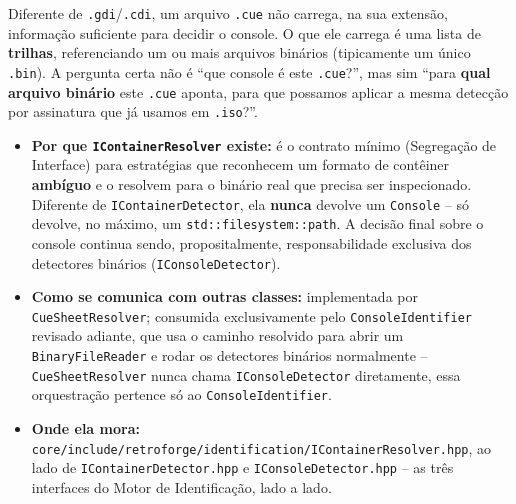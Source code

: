 Diferente de \texttt{.gdi}/\texttt{.cdi}, um arquivo \texttt{.cue} não carrega, na sua extensão, informação suficiente para decidir o console. O que ele carrega é uma lista de \textbf{trilhas}, referenciando um ou mais arquivos binários (tipicamente um único \texttt{.bin}). A pergunta certa não é ``que console é este \texttt{.cue}?'', mas sim ``para \textbf{qual arquivo binário} este \texttt{.cue} aponta, para que possamos aplicar a mesma detecção por assinatura que já usamos em \texttt{.iso}?''.

\begin{itemize}
    \item \textbf{Por que \texttt{IContainerResolver} existe:} é o contrato mínimo (Segregação de Interface) para estratégias que reconhecem um formato de contêiner \textbf{ambíguo} e o resolvem para o binário real que precisa ser inspecionado. Diferente de \texttt{IContainerDetector}, ela \textbf{nunca} devolve um \texttt{Console} -- só devolve, no máximo, um \texttt{std::filesystem::path}. A decisão final sobre o console continua sendo, propositalmente, responsabilidade exclusiva dos detectores binários (\texttt{IConsoleDetector}).
    \item \textbf{Como se comunica com outras classes:} implementada por \texttt{CueSheetResolver}; consumida exclusivamente pelo \texttt{ConsoleIdentifier} revisado adiante, que usa o caminho resolvido para abrir um \texttt{BinaryFileReader} e rodar os detectores binários normalmente -- \texttt{CueSheetResolver} nunca chama \texttt{IConsoleDetector} diretamente, essa orquestração pertence só ao \texttt{ConsoleIdentifier}.
    \item \textbf{Onde ela mora:} \texttt{core/include/retroforge/identification/IContainerResolver.hpp}, ao lado de \texttt{IContainerDetector.hpp} e \texttt{IConsoleDetector.hpp} -- as três interfaces do Motor de Identificação, lado a lado.
\end{itemize}

